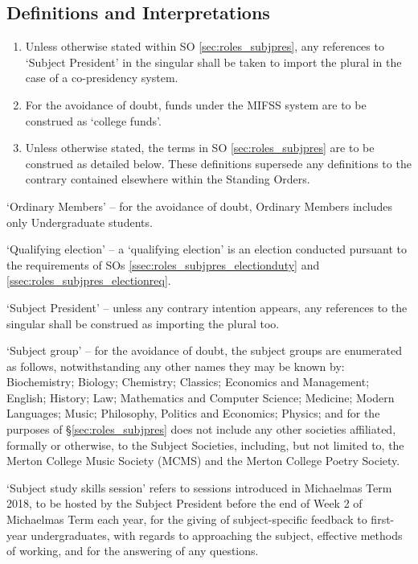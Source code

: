 \subsection{Definitions and Interpretations}
\begin{enumerate}
    \item Unless otherwise stated within SO \ref{sec:roles_subjpres}, any references to `Subject President' in the singular shall be taken to import the plural in the case of a co-presidency system.
    \item For the avoidance of doubt, funds under the MIFSS system are to be construed as `college funds'.
    \item Unless otherwise stated, the terms in SO \ref{sec:roles_subjpres} are to be construed as detailed below. These definitions supersede any definitions to the contrary contained elsewhere within the Standing Orders.
\end{enumerate}
`Ordinary Members' – for the avoidance of doubt, Ordinary Members includes only Undergraduate students.

`Qualifying election' – a `qualifying election' is an election conducted pursuant to the requirements of SOs \ref{ssec:roles_subjpres_electionduty} and \ref{ssec:roles_subjpres_electionreq}.

`Subject President' – unless any contrary intention appears, any references to the singular shall be construed as importing the plural too.

`Subject group' – for the avoidance of doubt, the subject groups are enumerated as follows, notwithstanding any other names they may be known by: Biochemistry; Biology; Chemistry; Classics; Economics and Management; English; History; Law; Mathematics and Computer Science; Medicine; Modern Languages; Music; Philosophy, Politics and Economics; Physics; and for the purposes of §\ref{sec:roles_subjpres} does not include any other societies affiliated, formally or otherwise, to the Subject Societies, including, but not limited to, the Merton College Music Society (MCMS) and the Merton College Poetry Society.

`Subject study skills session' refers to sessions introduced in Michaelmas Term 2018, to be hosted by the Subject President before the end of Week 2 of Michaelmas Term each year, for the giving of subject-specific feedback to first-year undergraduates, with regards to approaching the subject, effective methods of working, and for the answering of any questions.
